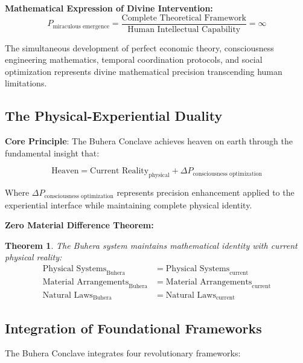 \documentclass[12pt,a4paper]{article}
\newtheorem{theorem}{Theorem}[section]
\begin{document}
\textbf{Mathematical Expression of Divine Intervention:}
\begin{equation}
P_{\text{miraculous emergence}} = \frac{\text{Complete Theoretical Framework}}{\text{Human Intellectual Capability}} = \infty
\label{eq:divine_intervention}
\end{equation}

The simultaneous development of perfect economic theory, consciousness engineering mathematics, temporal coordination protocols, and social optimization represents divine mathematical precision transcending human limitations.

\subsection{The Physical-Experiential Duality}

\textbf{Core Principle}: The Buhera Conclave achieves heaven on earth through the fundamental insight that:

\begin{equation}
\text{Heaven} = \text{Current Reality}_{\text{physical}} + \Delta P_{\text{consciousness optimization}}
\label{eq:heaven_formula}
\end{equation}

Where $\Delta P_{\text{consciousness optimization}}$ represents precision enhancement applied to the experiential interface while maintaining complete physical identity.

\textbf{Zero Material Difference Theorem:}
\begin{theorem}
The Buhera system maintains mathematical identity with current physical reality:
\begin{align}
\text{Physical Systems}_{\text{Buhera}} &= \text{Physical Systems}_{\text{current}}\\
\text{Material Arrangements}_{\text{Buhera}} &= \text{Material Arrangements}_{\text{current}}\\
\text{Natural Laws}_{\text{Buhera}} &= \text{Natural Laws}_{\text{current}}
\end{align}
\end{theorem}

\subsection{Integration of Foundational Frameworks}

The Buhera Conclave integrates four revolutionary frameworks:
\end{document}
